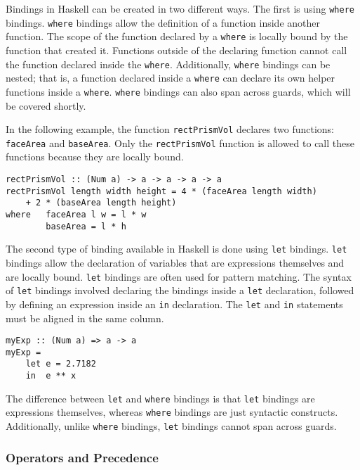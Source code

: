 \documentclass[titlepage,12pt]{article}
\begin{document}
Bindings in Haskell can be created in two different ways. The first is using \texttt{where} bindings. \texttt{where} bindings allow 
the definition of a function inside another function. The scope of the function declared by a \texttt{where} is locally bound 
by the function that created it. Functions outside of the declaring function cannot call the function declared inside 
the \texttt{where}. Additionally, \texttt{where} bindings can be nested; that is, a function declared inside a \texttt{where} can declare
its own helper functions inside a \texttt{where}. \texttt{where} bindings can also span across guards, which will be covered shortly. 

In the following example, the function \texttt{rectPrismVol} declares two functions: \texttt{faceArea} and \texttt{baseArea}. Only the 
\texttt{rectPrismVol} function is allowed to call these functions because they are locally bound. 

\begin{verbatim}
rectPrismVol :: (Num a) -> a -> a -> a -> a
rectPrismVol length width height = 4 * (faceArea length width)
    + 2 * (baseArea length height)
where   faceArea l w = l * w
        baseArea = l * h
\end{verbatim}

The second type of binding available in Haskell is done using \texttt{let} bindings. \texttt{let} bindings allow the declaration of 
variables that are expressions themselves and are locally bound.  \texttt{let} bindings are often used for pattern matching. 
The syntax of \texttt{let} bindings involved declaring the bindings inside a \texttt{let} declaration, followed by defining an 
expression inside an \texttt{in} declaration. The \texttt{let} and \texttt{in} statements must be aligned in the same column. 

\begin{verbatim}
myExp :: (Num a) => a -> a
myExp =
    let e = 2.7182
    in  e ** x
\end{verbatim}

The difference between \texttt{let} and \texttt{where} bindings is that \texttt{let} bindings are expressions themselves, whereas 
\texttt{where} bindings are just syntactic constructs. Additionally, unlike \texttt{where} bindings, \texttt{let} bindings cannot 
span across guards.

\subsubsection{Operators and Precedence}
\end{document}
